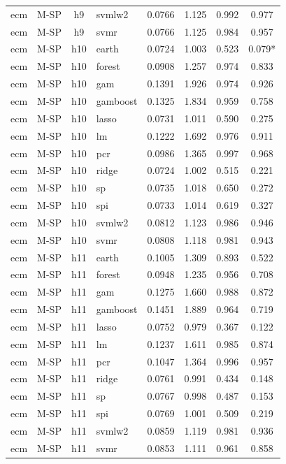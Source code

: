 \begin{ThreePartTable}
\begin{longtable}[t]{llclcccc}
ecm & M-SP & h9 & svmlw2 & 0.0766 & 1.125 & 0.992 & 0.977\\
ecm & M-SP & h9 & svmr & 0.0766 & 1.125 & 0.984 & 0.957\\
\addlinespace
ecm & M-SP & h10 & earth & 0.0724 & 1.003 & 0.523 & 0.079*\\
ecm & M-SP & h10 & forest & 0.0908 & 1.257 & 0.974 & 0.833\\
ecm & M-SP & h10 & gam & 0.1391 & 1.926 & 0.974 & 0.926\\
ecm & M-SP & h10 & gamboost & 0.1325 & 1.834 & 0.959 & 0.758\\
ecm & M-SP & h10 & lasso & 0.0731 & 1.011 & 0.590 & 0.275\\
ecm & M-SP & h10 & lm & 0.1222 & 1.692 & 0.976 & 0.911\\
ecm & M-SP & h10 & pcr & 0.0986 & 1.365 & 0.997 & 0.968\\
ecm & M-SP & h10 & ridge & 0.0724 & 1.002 & 0.515 & 0.221\\
ecm & M-SP & h10 & sp & 0.0735 & 1.018 & 0.650 & 0.272\\
ecm & M-SP & h10 & spi & 0.0733 & 1.014 & 0.619 & 0.327\\
ecm & M-SP & h10 & svmlw2 & 0.0812 & 1.123 & 0.986 & 0.946\\
ecm & M-SP & h10 & svmr & 0.0808 & 1.118 & 0.981 & 0.943\\
\addlinespace
ecm & M-SP & h11 & earth & 0.1005 & 1.309 & 0.893 & 0.522\\
ecm & M-SP & h11 & forest & 0.0948 & 1.235 & 0.956 & 0.708\\
ecm & M-SP & h11 & gam & 0.1275 & 1.660 & 0.988 & 0.872\\
ecm & M-SP & h11 & gamboost & 0.1451 & 1.889 & 0.964 & 0.719\\
ecm & M-SP & h11 & lasso & 0.0752 & 0.979 & 0.367 & 0.122\\
ecm & M-SP & h11 & lm & 0.1237 & 1.611 & 0.985 & 0.874\\
ecm & M-SP & h11 & pcr & 0.1047 & 1.364 & 0.996 & 0.957\\
ecm & M-SP & h11 & ridge & 0.0761 & 0.991 & 0.434 & 0.148\\
ecm & M-SP & h11 & sp & 0.0767 & 0.998 & 0.487 & 0.153\\
ecm & M-SP & h11 & spi & 0.0769 & 1.001 & 0.509 & 0.219\\
ecm & M-SP & h11 & svmlw2 & 0.0859 & 1.119 & 0.981 & 0.936\\
ecm & M-SP & h11 & svmr & 0.0853 & 1.111 & 0.961 & 0.858\\

\end{longtable}
\end{ThreePartTable}
